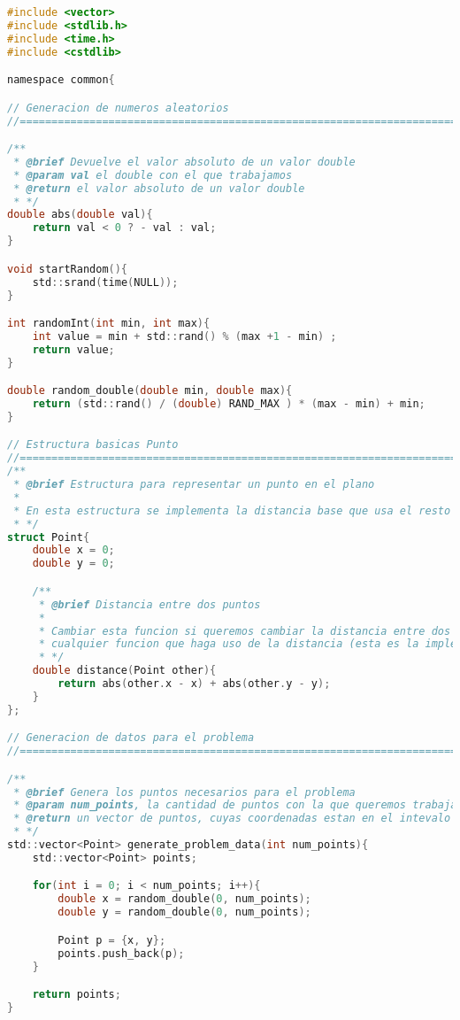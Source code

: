 \documentclass[10pt, a4paper]{article}
\theoremstyle{theorem-style}
\theoremstyle{theorem-style}
\theoremstyle{definition-style}
\theoremstyle{remark-style}
\theoremstyle{example-style}
\theoremstyle{definition-style}
\theoremstyle{remark-style}
\begin{document}
\begin{lstlisting}[language=C]
#include <vector>
#include <stdlib.h>
#include <time.h>
#include <cstdlib>

namespace common{

// Generacion de numeros aleatorios
//==============================================================================

/**
 * @brief Devuelve el valor absoluto de un valor double 
 * @param val el double con el que trabajamos
 * @return el valor absoluto de un valor double
 * */
double abs(double val){
    return val < 0 ? - val : val;
}

void startRandom(){
    std::srand(time(NULL));
}

int randomInt(int min, int max){
    int value = min + std::rand() % (max +1 - min) ;
    return value;
} 

double random_double(double min, double max){
    return (std::rand() / (double) RAND_MAX ) * (max - min) + min;
}

// Estructura basicas Punto
//==============================================================================
/**
 * @brief Estructura para representar un punto en el plano
 *
 * En esta estructura se implementa la distancia base que usa el resto de las funciones
 * */
struct Point{
    double x = 0;
    double y = 0;

    /**
     * @brief Distancia entre dos puntos
     *
     * Cambiar esta funcion si queremos cambiar la distancia entre dos puntos para 
     * cualquier funcion que haga uso de la distancia (esta es la implementacion base)
     * */
    double distance(Point other){
        return abs(other.x - x) + abs(other.y - y);
    }
};

// Generacion de datos para el problema
//==============================================================================

/**
 * @brief Genera los puntos necesarios para el problema
 * @param num_points, la cantidad de puntos con la que queremos trabajar
 * @return un vector de puntos, cuyas coordenadas estan en el intevalo [0, num_points]
 * */
std::vector<Point> generate_problem_data(int num_points){
    std::vector<Point> points;

    for(int i = 0; i < num_points; i++){
        double x = random_double(0, num_points);
        double y = random_double(0, num_points);

        Point p = {x, y};
        points.push_back(p);
    }

    return points;
}


\end{lstlisting}
\end{document}
